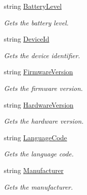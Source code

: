 \begin{DoxyCompactItemize}
string \hyperlink{classClient_1_1Common_1_1Models_1_1Device_a1de2a8db856d258ad6987d81cdae9ea8}{Battery\+Level}
\begin{DoxyCompactList}\small\item\em Gets the battery level. \end{DoxyCompactList}\item 
string \hyperlink{classClient_1_1Common_1_1Models_1_1Device_afcedfb23804f4fa905e3cf534d17d44e}{Device\+Id}
\begin{DoxyCompactList}\small\item\em Gets the device identifier. \end{DoxyCompactList}\item 
string \hyperlink{classClient_1_1Common_1_1Models_1_1Device_a6b657ab02d25e6cec66bd1a9f5028b23}{Firmware\+Version}
\begin{DoxyCompactList}\small\item\em Gets the firmware version. \end{DoxyCompactList}\item 
string \hyperlink{classClient_1_1Common_1_1Models_1_1Device_a128b70305a8c34966c21031112172fe4}{Hardware\+Version}
\begin{DoxyCompactList}\small\item\em Gets the hardware version. \end{DoxyCompactList}\item 
string \hyperlink{classClient_1_1Common_1_1Models_1_1Device_ac83cd54233e05b757043739f6e82e7f4}{Language\+Code}
\begin{DoxyCompactList}\small\item\em Gets the language code. \end{DoxyCompactList}\item 
string \hyperlink{classClient_1_1Common_1_1Models_1_1Device_aba04a67247d5964c96429b5088126b99}{Manufacturer}
\begin{DoxyCompactList}\small\item\em Gets the manufacturer. \end{DoxyCompactList}\item 

\end{DoxyCompactItemize}
